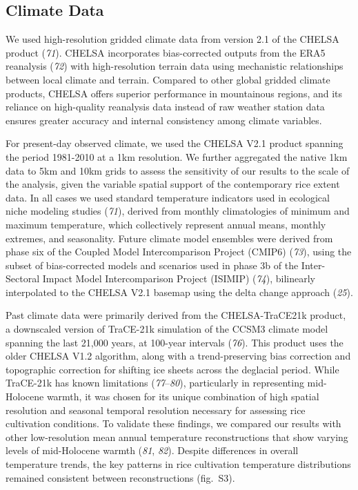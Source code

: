 \documentclass[
  letterpaper,
  DIV=11,
  numbers=noendperiod]{scrartcl}
\begin{document}
\subsection{Climate Data}\label{climate-data}

We used high-resolution gridded climate data from version 2.1 of the
CHELSA product (\emph{71}). CHELSA incorporates bias-corrected outputs
from the ERA5 reanalysis (\emph{72}) with high-resolution terrain data
using mechanistic relationships between local climate and terrain.
Compared to other global gridded climate products, CHELSA offers
superior performance in mountainous regions, and its reliance on
high-quality reanalysis data instead of raw weather station data ensures
greater accuracy and internal consistency among climate variables.

For present-day observed climate, we used the CHELSA V2.1 product
spanning the period 1981-2010 at a 1km resolution. We further aggregated
the native 1km data to 5km and 10km grids to assess the sensitivity of
our results to the scale of the analysis, given the variable spatial
support of the contemporary rice extent data. In all cases we used
standard temperature indicators used in ecological niche modeling
studies (\emph{71}), derived from monthly climatologies of minimum and
maximum temperature, which collectively represent annual means, monthly
extremes, and seasonality. Future climate model ensembles were derived
from phase six of the Coupled Model Intercomparison Project (CMIP6)
(\emph{73}), using the subset of bias-corrected models and scenarios
used in phase 3b of the Inter-Sectoral Impact Model Intercomparison
Project (ISIMIP) (\emph{74}), bilinearly interpolated to the CHELSA V2.1
basemap using the delta change approach (\emph{25}).

Past climate data were primarily derived from the CHELSA-TraCE21k
product, a downscaled version of TraCE-21k simulation of the CCSM3
climate model spanning the last 21,000 years, at 100-year intervals
(\emph{76}). This product uses the older CHELSA V1.2 algorithm, along
with a trend-preserving bias correction and topographic correction for
shifting ice sheets across the deglacial period. While TraCE-21k has
known limitations (\emph{77}--\emph{80}), particularly in representing
mid-Holocene warmth, it was chosen for its unique combination of high
spatial resolution and seasonal temporal resolution necessary for
assessing rice cultivation conditions. To validate these findings, we
compared our results with other low-resolution mean annual temperature
reconstructions that show varying levels of mid-Holocene warmth
(\emph{81}, \emph{82}). Despite differences in overall temperature
trends, the key patterns in rice cultivation temperature distributions
remained consistent between reconstructions (fig.~S3).
\end{document}
